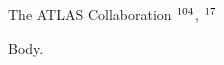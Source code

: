 \documentclass{atlasdoc}
\begin{document}
\maketitle
\begin{flushleft}
{\Large The ATLAS Collaboration}
$^\textrm{\scriptsize 104}$,
$^\textrm{\scriptsize 17}$
\end{flushleft}
Body.
\end{document}
